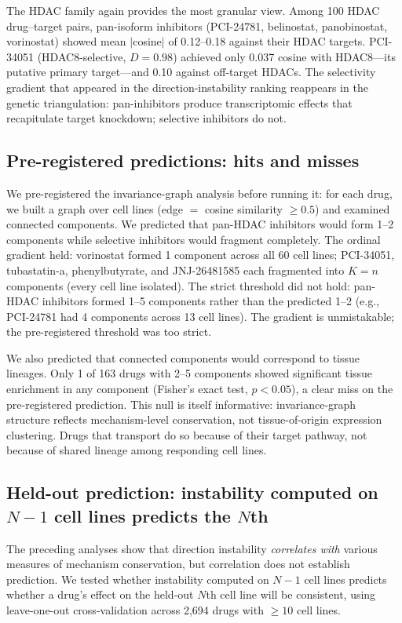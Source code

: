 \documentclass{article}
\begin{document}
The HDAC family again provides the most granular view. Among 100 HDAC
drug--target pairs, pan-isoform inhibitors (PCI-24781, belinostat,
panobinostat, vorinostat) showed mean $|$cosine$|$ of 0.12--0.18 against
their HDAC targets. PCI-34051 (HDAC8-selective, $D = 0.98$) achieved only
0.037 cosine with HDAC8---its putative primary target---and 0.10 against
off-target HDACs. The selectivity gradient that appeared in the
direction-instability ranking reappears in the genetic triangulation:
pan-inhibitors produce transcriptomic effects that recapitulate target
knockdown; selective inhibitors do not.

\subsection{Pre-registered predictions: hits and misses}

We pre-registered the invariance-graph analysis before running it: for
each drug, we built a graph over cell lines (edge $=$ cosine similarity
$\geq 0.5$) and examined connected components. We predicted that
pan-HDAC inhibitors would form 1--2 components while selective
inhibitors would fragment completely. The ordinal gradient held:
vorinostat formed 1 component across all 60 cell lines; PCI-34051,
tubastatin-a, phenylbutyrate, and JNJ-26481585 each fragmented into
$K = n$ components (every cell line isolated). The strict threshold
did not hold: pan-HDAC inhibitors formed 1--5 components rather
than the predicted 1--2 (e.g., PCI-24781 had 4 components across
13 cell lines). The gradient is unmistakable; the pre-registered
threshold was too strict.

We also predicted that connected components would correspond to
tissue lineages. Only 1 of 163 drugs with 2--5 components showed
significant tissue enrichment in any component (Fisher's exact test,
$p < 0.05$), a clear miss on the pre-registered prediction.
This null is itself informative: invariance-graph structure reflects
mechanism-level conservation, not tissue-of-origin expression
clustering. Drugs that transport do so because of their target
pathway, not because of shared lineage among responding cell lines.

\subsection{Held-out prediction: instability computed on $N{-}1$ cell
lines predicts the $N$th}
\label{sec:holdout}

The preceding analyses show that direction instability \emph{correlates
with} various measures of mechanism conservation, but correlation does
not establish prediction. We tested whether instability computed on
$N{-}1$ cell lines predicts whether a drug's effect on the held-out
$N$th cell line will be consistent, using leave-one-out cross-validation
across 2{,}694 drugs with $\geq 10$ cell lines.
\end{document}
